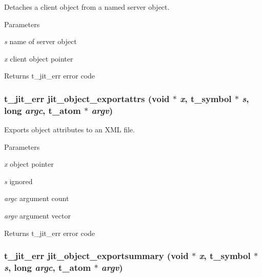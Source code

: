 Detaches a client object from a named server object. 
\begin{DoxyParams}{Parameters}
\item[{\em s}]name of server object \item[{\em x}]client object pointer\end{DoxyParams}
\begin{DoxyReturn}{Returns}
t\_\-jit\_\-err error code 
\end{DoxyReturn}
\hypertarget{group__objectmod_ga62d196313913e245d4baa69ed2308f01}{
\subsubsection[{jit\_\-object\_\-exportattrs}]{\setlength{\rightskip}{0pt plus 5cm}t\_\-jit\_\-err jit\_\-object\_\-exportattrs (void $\ast$ {\em x}, \/  {\bf t\_\-symbol} $\ast$ {\em s}, \/  long {\em argc}, \/  {\bf t\_\-atom} $\ast$ {\em argv})}}
\label{group__objectmod_ga62d196313913e245d4baa69ed2308f01}


Exports object attributes to an XML file. 
\begin{DoxyParams}{Parameters}
\item[{\em x}]object pointer \item[{\em s}]ignored \item[{\em argc}]argument count \item[{\em argv}]argument vector\end{DoxyParams}
\begin{DoxyReturn}{Returns}
t\_\-jit\_\-err error code 
\end{DoxyReturn}
\hypertarget{group__objectmod_ga9be3b8c2e695b471dee3e9242691c472}{
\subsubsection[{jit\_\-object\_\-exportsummary}]{\setlength{\rightskip}{0pt plus 5cm}t\_\-jit\_\-err jit\_\-object\_\-exportsummary (void $\ast$ {\em x}, \/  {\bf t\_\-symbol} $\ast$ {\em s}, \/  long {\em argc}, \/  {\bf t\_\-atom} $\ast$ {\em argv})}}
\label{group__objectmod_ga9be3b8c2e695b471dee3e9242691c472}


